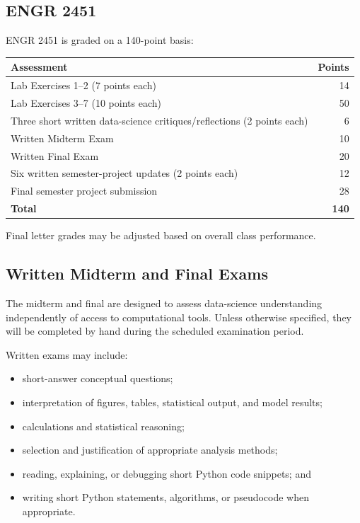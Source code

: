 \documentclass[11pt]{article}
\begin{document}
\subsection{ENGR 2451}

ENGR 2451 is graded on a 140-point basis:

\begin{center}
\begin{tabular}{@{}lr@{}}
\toprule
\textbf{Assessment} & \textbf{Points}\\
\midrule
Lab Exercises 1--2 (7 points each) & 14\\
Lab Exercises 3--7 (10 points each) & 50\\
Three short written data-science critiques/reflections (2 points each) & 6\\
Written Midterm Exam & 10\\
Written Final Exam & 20\\
Six written semester-project updates (2 points each) & 12\\
Final semester project submission & 28\\
\midrule
\textbf{Total} & \textbf{140}\\
\bottomrule
\end{tabular}
\end{center}

Final letter grades may be adjusted based on overall class performance.

\subsection{Written Midterm and Final Exams}

The midterm and final are designed to assess data-science understanding independently of access to computational tools. Unless otherwise specified, they will be completed by hand during the scheduled examination period.

Written exams may include:

\begin{itemize}
  \item short-answer conceptual questions;
  \item interpretation of figures, tables, statistical output, and model results;
  \item calculations and statistical reasoning;
  \item selection and justification of appropriate analysis methods;
  \item reading, explaining, or debugging short Python code snippets; and
  \item writing short Python statements, algorithms, or pseudocode when appropriate.
\end{itemize}
\end{document}
